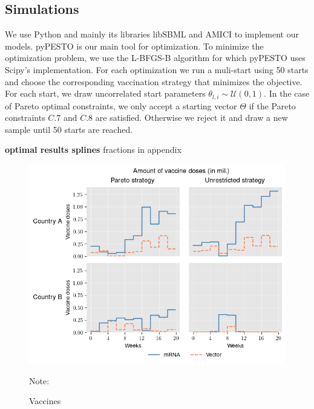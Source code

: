 \subsection{Simulations}
We use Python and mainly its libraries libSBML \citep{Bornstein.2008} and AMICI \citep{Frohlich.2020} to implement our models. pyPESTO \citep{pyPESTO} is our main tool for optimization. To minimize the optimization problem, we use the L-BFGS-B algorithm \citep{Zhu.1997} for which pyPESTO uses Scipy's \citep{scipy.2020} implementation. For each optimization we run a muli-start using 50 starts and choose the corresponding vaccination strategy that minimizes the objective. For each start, we draw uncorrelated start parameters $\theta_{l,i} \sim \mathcal{U}(0,1)$. In the case of Pareto optimal constraints, we only accept a starting vector $\Theta$ if the Pareto constraints $C.7$ and $C.8$ are satisfied. Otherwise we reject it and draw a new sample until 50 starts are reached.

\textbf{optimal results splines}
fractions in appendix
\begin{figure}[h!]
\centering
\includegraphics[scale=0.8]{images/piecewise_vaccine_total_quantity.png}\\
\begin{flushleft}
\scriptsize{Note:}
\end{flushleft}
\caption{Vaccines}
\label{fig:results_piecewise_allocation}
\end{figure}

